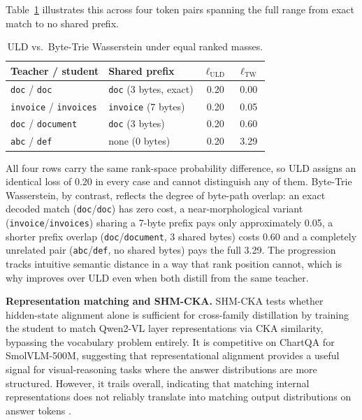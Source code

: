 Table~\ref{tab:uld-vs-tw} illustrates this across four token pairs spanning
the full range from exact match to no shared prefix.

\begin{table}
\centering
\caption[ULD vs.\ Byte-Trie Wasserstein under equal ranked masses.]{ULD vs.\ Byte-Trie Wasserstein under equal ranked masses.}
\label{tab:uld-vs-tw}
\small
\setlength{\tabcolsep}{7pt}
\renewcommand{\arraystretch}{1.2}
\begin{tabular}{@{}llcc@{}}
\toprule
\textbf{Teacher / student} & \textbf{Shared prefix} & \(\ell_{\mathrm{ULD}}\) & \(\ell_{\mathrm{TW}}\) \\
\midrule
\texttt{doc} / \texttt{doc}           & \texttt{doc} (3 bytes, exact)  & 0.20 & 0.00 \\
\texttt{invoice} / \texttt{invoices}  & \texttt{invoice} (7 bytes)     & 0.20 & 0.05 \\
\texttt{doc} / \texttt{document}      & \texttt{doc} (3 bytes)         & 0.20 & 0.60 \\
\texttt{abc} / \texttt{def}           & none (0 bytes)                 & 0.20 & 3.29 \\
\bottomrule
\end{tabular}
\end{table}

All four rows carry the same rank-space probability difference, so ULD assigns
an identical loss of 0.20 in every case and cannot distinguish any of them.
Byte-Trie Wasserstein, by contrast, reflects the degree of byte-path overlap:
an exact decoded match (\texttt{doc}/\texttt{doc}) has zero cost, a
near-morphological variant (\texttt{invoice}/\texttt{invoices}) sharing a
7-byte prefix pays only approximately 0.05, a shorter prefix overlap
(\texttt{doc}/\texttt{document}, 3 shared bytes) costs 0.60 and a completely
unrelated pair (\texttt{abc}/\texttt{def}, no shared bytes) pays the full
3.29. The progression tracks intuitive semantic distance in a way that rank
position cannot, which is why \methodname{} improves over ULD even when both
distill from the same teacher.

\textbf{Representation matching and SHM-CKA.}
SHM-CKA tests whether hidden-state alignment alone is sufficient for
cross-family distillation by training the student to match Qwen2-VL layer
representations via CKA similarity, bypassing the vocabulary problem
entirely. It is competitive on ChartQA for SmolVLM-500M, suggesting that
representational alignment provides a useful signal for visual-reasoning
tasks where the answer distributions are more structured. However, it trails
\methodname{} overall, indicating that matching internal representations does
not reliably translate into matching output distributions on answer tokens
\cite{kornblith2019similarityrepresentations,klabunde2023similarity}.

